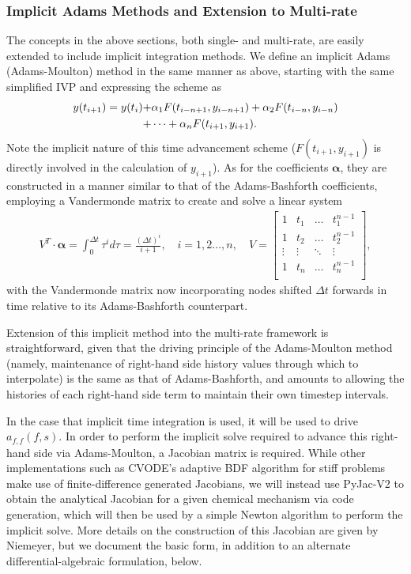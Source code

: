 \subsubsection{Implicit Adams Methods and Extension to Multi-rate}

The concepts in the above sections, both single- and multi-rate, are
easily extended to include implicit integration methods. We define an
implicit Adams (Adams-Moulton) method in the same manner as above, starting
with the same simplified IVP  and expressing the scheme as
\begin{align}
y(t_{i+1}) = y(t_{i}) +& \alpha_{1}F(t_{i-n+1},y_{i-n+1}) + \alpha_{2}F(t_{i-n},y_{i-n}) \notag \\
+& \cdots + \alpha_{n}F(t_{i+1},y_{i+1}). \label{eq:am_general}
\end{align}
Note the implicit nature of this time advancement scheme ($F(t_{i+1}, y_{i+1})$ is
directly involved in the calculation of $y_{i+1}$). As for the coefficients
$\boldsymbol{\alpha}$, they are constructed in a manner similar to that of
the Adams-Bashforth coefficients, employing a Vandermonde matrix to
create and solve a linear system
\begin{align}
V^{T} \cdot \boldsymbol{\alpha} = \int_0^{\Delta t} \tau^{i} d\tau = \frac{(\Delta t)^{i}}{i+1}, \quad i = 1,2...,n, \quad V = \begin{bmatrix}
    1 & t_{1} &  \hdots   & t_{1}^{n-1}  \\
    1 & t_{2} & \hdots &  t_{2}^{n-1} \\
      \vdots  & \vdots  &  \ddots   &  \vdots   \\
       1 &   t_{n}  &  \hdots  & t_{n}^{n-1} \\
        \end{bmatrix}, \label{eq:vandermonde_implicit}
\end{align}
with the Vandermonde matrix now incorporating nodes shifted $\Delta t$ forwards
in time relative to its Adams-Bashforth counterpart.

Extension of this implicit method into the multi-rate framework is
straightforward, given that the driving principle of the Adams-Moulton
method (namely, maintenance of right-hand side history values through
which to interpolate) is the same as that of Adams-Bashforth, and amounts to
allowing the histories of each right-hand side term to maintain their
own timestep intervals.

In the case that implicit time integration is used, it will be used
to drive $a_{f,f}(f,s)$. In order to perform the implicit solve required
to advance this right-hand side via Adams-Moulton, a Jacobian matrix
is required. While other implementations such as CVODE's adaptive BDF
algorithm for stiff problems make use of finite-difference generated
Jacobians, we will instead use PyJac-V2 to obtain the analytical Jacobian
for a given chemical mechanism via code generation, which will then
be used by a simple Newton algorithm to perform the implicit solve. More
details on the construction of this Jacobian are given by Niemeyer, but we
document the basic form, in addition to an alternate differential-algebraic
formulation, below.

